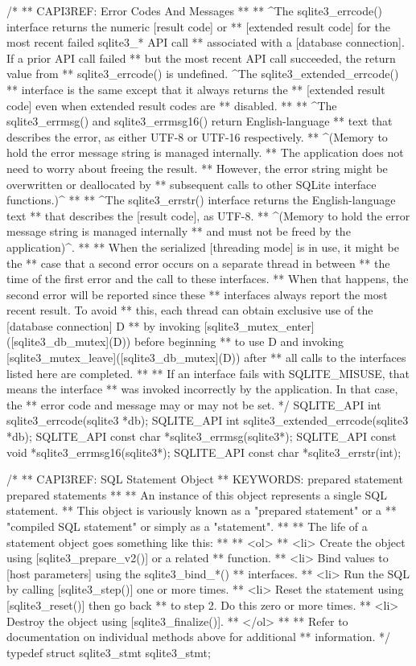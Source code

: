 \begin{Codex}[label=sqlite3.h,numbers=left]
{/*
** CAPI3REF: Error Codes And Messages
**
** ^The sqlite3_errcode() interface returns the numeric [result code] or
** [extended result code] for the most recent failed sqlite3_* API call
** associated with a [database connection]. If a prior API call failed
** but the most recent API call succeeded, the return value from
** sqlite3_errcode() is undefined.  ^The sqlite3_extended_errcode()
** interface is the same except that it always returns the 
** [extended result code] even when extended result codes are
** disabled.
**
** ^The sqlite3_errmsg() and sqlite3_errmsg16() return English-language
** text that describes the error, as either UTF-8 or UTF-16 respectively.
** ^(Memory to hold the error message string is managed internally.
** The application does not need to worry about freeing the result.
** However, the error string might be overwritten or deallocated by
** subsequent calls to other SQLite interface functions.)^
**
** ^The sqlite3_errstr() interface returns the English-language text
** that describes the [result code], as UTF-8.
** ^(Memory to hold the error message string is managed internally
** and must not be freed by the application)^.
**
** When the serialized [threading mode] is in use, it might be the
** case that a second error occurs on a separate thread in between
** the time of the first error and the call to these interfaces.
** When that happens, the second error will be reported since these
** interfaces always report the most recent result.  To avoid
** this, each thread can obtain exclusive use of the [database connection] D
** by invoking [sqlite3_mutex_enter]([sqlite3_db_mutex](D)) before beginning
** to use D and invoking [sqlite3_mutex_leave]([sqlite3_db_mutex](D)) after
** all calls to the interfaces listed here are completed.
**
** If an interface fails with SQLITE_MISUSE, that means the interface
** was invoked incorrectly by the application.  In that case, the
** error code and message may or may not be set.
*/
SQLITE_API int sqlite3_errcode(sqlite3 *db);
SQLITE_API int sqlite3_extended_errcode(sqlite3 *db);
SQLITE_API const char *sqlite3_errmsg(sqlite3*);
SQLITE_API const void *sqlite3_errmsg16(sqlite3*);
SQLITE_API const char *sqlite3_errstr(int);

/*
** CAPI3REF: SQL Statement Object
** KEYWORDS: {prepared statement} {prepared statements}
**
** An instance of this object represents a single SQL statement.
** This object is variously known as a "prepared statement" or a
** "compiled SQL statement" or simply as a "statement".
**
** The life of a statement object goes something like this:
**
** <ol>
** <li> Create the object using [sqlite3_prepare_v2()] or a related
**      function.
** <li> Bind values to [host parameters] using the sqlite3_bind_*()
**      interfaces.
** <li> Run the SQL by calling [sqlite3_step()] one or more times.
** <li> Reset the statement using [sqlite3_reset()] then go back
**      to step 2.  Do this zero or more times.
** <li> Destroy the object using [sqlite3_finalize()].
** </ol>
**
** Refer to documentation on individual methods above for additional
** information.
*/
typedef struct sqlite3_stmt sqlite3_stmt;

}
\end{Codex}
